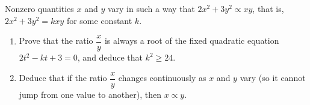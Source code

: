 Nonzero quantities $x$ and $y$ vary in such a way that $2x^2+3y^2\propto xy$, that is, $2x^2+3y^2=kxy$ for some constant $k$.
\begin{enumerate}
\item[(a)] Prove that the ratio $\dfrac xy$ is always a root of the fixed quadratic equation $2t^2-kt+3=0$, and deduce that $k^2\ge24$.
\item[(b)] Deduce that if the ratio $\dfrac xy$ changes continuously as $x$ and $y$ vary (so it cannot jump from one value to another), then $x\propto y$.
\end{enumerate}
